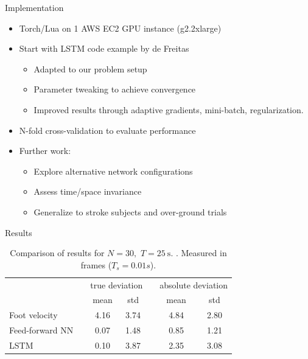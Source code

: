 \documentclass{beamer}
\newcommand{\ra}[1]{\renewcommand{\arraystretch}{#1}}
\begin{document}
\begin{frame}{Implementation}
    \begin{itemize}
        \item Torch/Lua on 1 AWS EC2 GPU instance (g2.2xlarge)
        \item Start with LSTM code example by de Freitas
        \begin{itemize}
            \item Adapted to our problem setup
            \item Parameter tweaking to achieve convergence
            \item Improved results through adaptive gradients, mini-batch, regularization.
        \end{itemize}
        \item N-fold cross-validation to evaluate performance
        \item Further work:
        \begin{itemize}
            \item Explore alternative network configurations
            \item Assess time/space invariance
            \item Generalize to stroke subjects and over-ground trials
        \end{itemize}
    \end{itemize}
\end{frame}

\begin{frame}{Results}
    \begin{table}[H]
        \begin{center}
        \ra{1.2}
        \begin{tabular}{@{} l c cc c cc@{}}
        \toprule
        && 
        \multicolumn{2}{c}{true deviation} 
        && 
        \multicolumn{2}{c}{absolute deviation} 
        \\
        \cmidrule{3-4} \cmidrule{6-7}
        {} && mean & std && mean & std \\
        \midrule
        Foot velocity   &&   4.16  &  3.74  &&  4.84  &  2.80 \\
        Feed-forward NN &&   0.07  &  1.48  &&  0.85  &  1.21 \\
        LSTM            &&   0.10  &  3.87  &&  2.35  &  3.08 \\
        \bottomrule
        \end{tabular}
        \caption
        {
            Comparison of results for
            \(
                N
                =
                30
                ,
            \)
            \(
                T
                =
                \SI
                {
                    25
                }
                {
                    \second
                }
                .
            \)
            . Measured in frames ($T_s=0.01s$).
        }
        \end{center}
    \end{table}
\end{frame}
\end{document}
